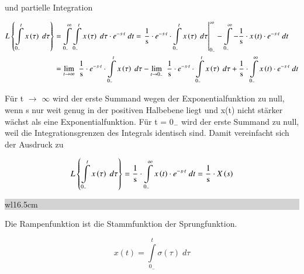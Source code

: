 \noindent und partielle Integration

\begin{equation}\label{eq:foursixty}
\begin{split}
L\left\{\int\limits _{0_{-} }^{t}x\left(\tau \right)\;d\tau  \right\} & = \int\limits _{0_{-} }^{\infty }\int\limits _{0_{-} }^{t}x\left(\tau \right)\;d\tau  \cdot e^{-s\cdot t} \; dt=\left. \frac{{\rm 1}}{{\rm s}} \cdot e^{-s\cdot t} \cdot \int\limits _{0_{-} }^{t}x\left(\tau \right)\;d\tau  \right|_{0_{-} }^{\infty } -\int\limits _{0_{-} }^{\infty }-\frac{{\rm 1}}{{\rm s}} \cdot x\left(t\right)\cdot e^{-s\cdot t} \; dt \\ 
& = \lim \limits_{t\to \infty } \, \, \frac{{\rm 1}}{{\rm s}} \cdot e^{-s\cdot t} \cdot \int\limits _{0_{-} }^{t}x\left(\tau \right)\;d\tau  -\lim \limits_{t\to 0_{-} } \, \, \frac{{\rm 1}}{{\rm s}} \cdot e^{-s\cdot t} \cdot \int\limits _{0_{-} }^{t}x\left(\tau \right)\;d\tau  +\frac{{\rm 1}}{{\rm s}} \cdot \int\limits _{0_{-} }^{\infty }x\left(t\right)\cdot e^{-s\cdot t}\; dt
\end{split}
\end{equation}

\noindent Für t $\rightarrow$ $\mathrm{\infty}$ wird der erste Summand wegen der Exponentialfunktion zu null, wenn s nur weit genug in der positiven Halbebene liegt und x(t) nicht stärker wächst als eine Exponentialfunktion. Für t = 0$_{-}$ wird der erste Summand zu null, weil die Integrationsgrenzen des Integrals identisch sind. Damit vereinfacht sich der Ausdruck zu

\begin{equation}\label{eq:foursixtyone}
L\left\{\int\limits _{0_{-} }^{t}x\left(\tau \right)\;d\tau  \right\}=\frac{{\rm 1}}{{\rm s}} \cdot \int\limits _{0_{-} }^{\infty }x\left(t\right)\cdot e^{-s\cdot t} \; dt=\frac{{\rm 1}}{{\rm s}} \cdot X\left(s\right)
\end{equation}\bigskip

\noindent
\colorbox{lightgray}{%
%
\renewcommand\arraystretch{0.6}%
\begin{tabular}{ wl{16.5cm} }
{\selectfont{Beispiel: Integrationsregel der Laplace-Transformation}}
\end{tabular}%
}\bigskip

\noindent Die Rampenfunktion ist die Stammfunktion der Sprungfunktion.

\begin{equation}\label{eq:foursixtytwo}
x\left(t\right)=\int\limits _{0_{-} }^{t}\sigma \left(\tau \right) \; d\tau
\end{equation}

